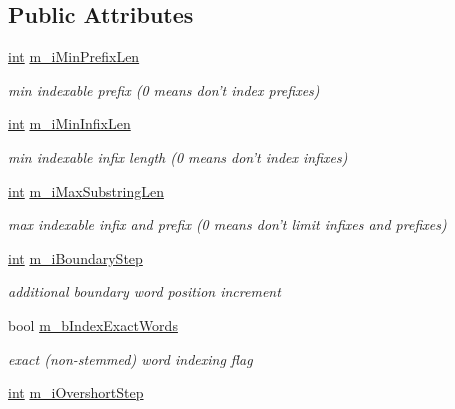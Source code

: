\subsection*{Public Attributes}
\begin{DoxyCompactItemize}
\item 
\hyperlink{sphinxexpr_8cpp_a4a26e8f9cb8b736e0c4cbf4d16de985e}{int} \hyperlink{structCSphSourceSettings_a7256ccbc374d3a218e62e5eca67d196e}{m\-\_\-i\-Min\-Prefix\-Len}
\begin{DoxyCompactList}\small\item\em min indexable prefix (0 means don't index prefixes) \end{DoxyCompactList}\item 
\hyperlink{sphinxexpr_8cpp_a4a26e8f9cb8b736e0c4cbf4d16de985e}{int} \hyperlink{structCSphSourceSettings_ac0d1b57d5e2287bd0e17ca1dc3e4f369}{m\-\_\-i\-Min\-Infix\-Len}
\begin{DoxyCompactList}\small\item\em min indexable infix length (0 means don't index infixes) \end{DoxyCompactList}\item 
\hyperlink{sphinxexpr_8cpp_a4a26e8f9cb8b736e0c4cbf4d16de985e}{int} \hyperlink{structCSphSourceSettings_ad7fa82ac9f78dc9760660f99e23f8533}{m\-\_\-i\-Max\-Substring\-Len}
\begin{DoxyCompactList}\small\item\em max indexable infix and prefix (0 means don't limit infixes and prefixes) \end{DoxyCompactList}\item 
\hyperlink{sphinxexpr_8cpp_a4a26e8f9cb8b736e0c4cbf4d16de985e}{int} \hyperlink{structCSphSourceSettings_ab91af5eb3f973f662ad5665e17cb3e1f}{m\-\_\-i\-Boundary\-Step}
\begin{DoxyCompactList}\small\item\em additional boundary word position increment \end{DoxyCompactList}\item 
bool \hyperlink{structCSphSourceSettings_ab86dee87a2c0a859e7ea976d9dca9850}{m\-\_\-b\-Index\-Exact\-Words}
\begin{DoxyCompactList}\small\item\em exact (non-\/stemmed) word indexing flag \end{DoxyCompactList}\item 
\hyperlink{sphinxexpr_8cpp_a4a26e8f9cb8b736e0c4cbf4d16de985e}{int} \hyperlink{structCSphSourceSettings_a6a95197835b39a65f765c9aa78c3a4e9}{m\-\_\-i\-Overshort\-Step}

\end{DoxyCompactItemize}
